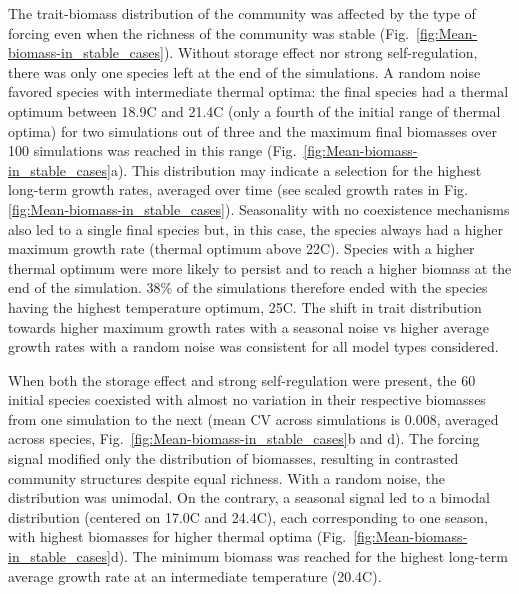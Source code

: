 \documentclass[a4paper,12pt]{article}
\begin{document}
The trait-biomass distribution of the community was affected by the
type of forcing even when the richness of the community was stable
(Fig.~\ref{fig:Mean-biomass-in_stable_cases}). Without storage effect
nor strong self-regulation, there was only one species left at the
end of the simulations. A random noise favored species with intermediate
thermal optima: the final species had a thermal optimum between 18.9\textdegree C
and 21.4\textdegree C (only a fourth of the initial range of thermal optima)
for two simulations out of three and the maximum final biomasses over
100 simulations was reached in this range (Fig.~\ref{fig:Mean-biomass-in_stable_cases}a).
This distribution may indicate a selection for the highest long-term
growth rates, averaged over time (see scaled growth rates in Fig.
\ref{fig:Mean-biomass-in_stable_cases}). Seasonality with no coexistence
mechanisms also led to a single final species but, in this case, the
species always had a higher maximum growth rate (thermal optimum above
22\textdegree C). Species with a higher thermal optimum were more likely to persist
and to reach a higher biomass at the end of the simulation. 38\% of
the simulations therefore ended with the species having the highest
temperature optimum, 25\textdegree C. The shift in trait distribution towards
higher maximum growth rates with a seasonal noise vs higher average
growth rates with a random noise was consistent for all model types
considered.

When both the storage effect and strong self-regulation were present,
the 60 initial species coexisted with almost no variation in their respective
biomasses from one simulation to the next (mean CV across simulations
is 0.008, averaged across species, Fig.~\ref{fig:Mean-biomass-in_stable_cases}b
and d). The forcing signal modified only the distribution of biomasses,
resulting in contrasted community structures despite equal richness.
With a random noise, the distribution was unimodal. On the contrary,
a seasonal signal led to a bimodal distribution (centered on 17.0\textdegree C
and 24.4\textdegree C), each corresponding to one season, with highest biomasses
for higher thermal optima (Fig.~\ref{fig:Mean-biomass-in_stable_cases}d).
The minimum biomass was reached for the highest long-term average
growth rate at an intermediate temperature (20.4\textdegree C).
\end{document}
